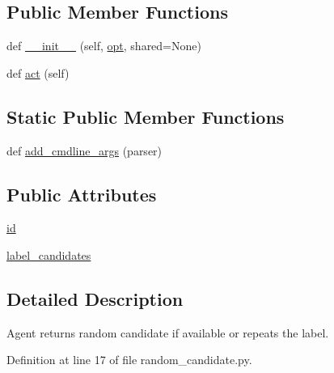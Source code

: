 \subsection*{Public Member Functions}
\begin{DoxyCompactItemize}
\item 
def \hyperlink{classparlai_1_1agents_1_1random__candidate_1_1random__candidate_1_1RandomCandidateAgent_a3c2a96128e8a9825e552d6e999e55490}{\+\_\+\+\_\+init\+\_\+\+\_\+} (self, \hyperlink{classparlai_1_1core_1_1agents_1_1Agent_ab3b45d2754244608c75d4068b90cd051}{opt}, shared=None)
\item 
def \hyperlink{classparlai_1_1agents_1_1random__candidate_1_1random__candidate_1_1RandomCandidateAgent_acb0a6e3c223f9e784a668d24b3e7fc82}{act} (self)
\end{DoxyCompactItemize}
\subsection*{Static Public Member Functions}
\begin{DoxyCompactItemize}
\item 
def \hyperlink{classparlai_1_1agents_1_1random__candidate_1_1random__candidate_1_1RandomCandidateAgent_adf32b766729393efc5fbdffee363f75a}{add\+\_\+cmdline\+\_\+args} (parser)
\end{DoxyCompactItemize}
\subsection*{Public Attributes}
\begin{DoxyCompactItemize}
\item 
\hyperlink{classparlai_1_1agents_1_1random__candidate_1_1random__candidate_1_1RandomCandidateAgent_adc2ff06b9b7e9463dc00dfa227fdc7d6}{id}
\item 
\hyperlink{classparlai_1_1agents_1_1random__candidate_1_1random__candidate_1_1RandomCandidateAgent_abd4570210c517ac8da9f269f8302f228}{label\+\_\+candidates}
\end{DoxyCompactItemize}


\subsection{Detailed Description}
\begin{DoxyVerb}Agent returns random candidate if available or repeats the label.\end{DoxyVerb}
 

Definition at line 17 of file random\+\_\+candidate.\+py.



